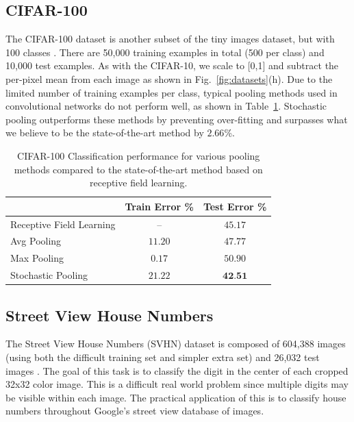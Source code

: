 \documentclass{article} %
\newcommand{\fig}[1]{Fig.~\ref{fig:#1}}
\newcommand{\tab}[1]{Table~\ref{tab:#1}}
\begin{document}
\subsection{CIFAR-100}

The CIFAR-100 dataset is another subset of the tiny images dataset,
but with 100 classes \cite{Kriz09}. There are 50,000 training examples in total (500
per class) and 10,000 test examples. As with the CIFAR-10, we scale to [0,1] and subtract
the per-pixel mean from each image as shown in \fig{datasets}(h). Due
to the limited number of training examples per class, typical pooling
methods used in convolutional networks do not perform well, as shown in
\tab{cifar100}. Stochastic pooling outperforms these methods by
preventing over-fitting and surpasses what we believe to be the state-of-the-art
method by $2.66$\%.

\begin{table}[h!]
\small
\vspace*{-2mm}
\begin{center}
\begin{tabular}{|l|c|c|}
  \hline
  & Train Error \% & Test Error \% \\
  \hline Receptive Field Learning \cite{Jia11} & -- & $45.17$ \\
  \hline  \hline   %
  Avg Pooling & $11.20$ & $47.77$ \\
   \hline %
  Max Pooling & $0.17$ & $50.90$ \\
   \hline %
  Stochastic Pooling & $21.22$ & $\textbf{42.51}$ \\
   \hline
\end{tabular}
\vspace*{-1mm}
\caption{CIFAR-100 Classification performance for various pooling
  methods compared to the state-of-the-art method based on receptive
  field learning.}
\label{tab:cifar100}
\end{center}
\vspace*{-6mm}
\end{table}


\subsection{Street View House Numbers} \label{sec:SVHN}

The Street View House Numbers (SVHN) dataset is composed of 604,388
images (using both the difficult training set and simpler extra set)
and 26,032 test images \cite{SVHN}. The goal of this task is to classify the digit
in the center of each cropped 32x32 color image. This is a difficult real
world problem since multiple digits may be visible within each
image. The practical application of this is to classify house numbers
throughout Google's street view database of images.
\end{document}
